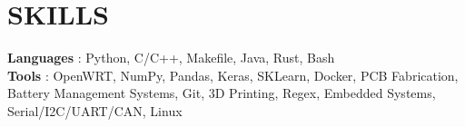\section{SKILLS}
\begin{itemize}[leftmargin=0in, label={}]
    \small{\item{
                    \textbf{Languages} {: Python, C/C++, Makefile, Java, Rust, Bash}\vspace{2pt} \\
                    \textbf{Tools}     {: OpenWRT, NumPy, Pandas, Keras, SKLearn, Docker, PCB Fabrication, Battery Management Systems, Git, 3D Printing, Regex, Embedded Systems, Serial/I2C/UART/CAN, Linux}
              }}
\end{itemize}
